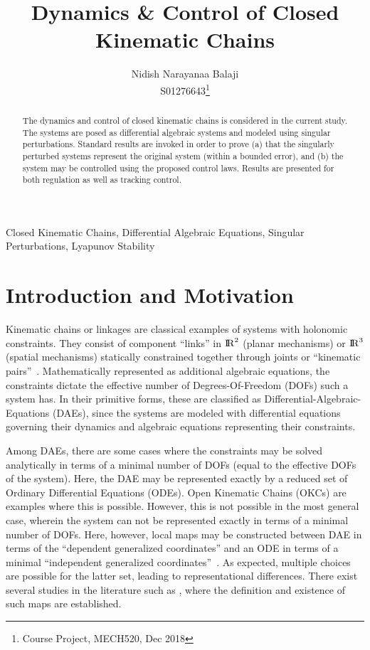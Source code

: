 \documentclass[10pt,final,journal,letterpaper,oneside,twocolumn]{IEEEtran}
\title{Dynamics \& Control of Closed Kinematic Chains}
\author{Nidish Narayanaa Balaji\\S01276643\thanks{Course Project,
    MECH520, Dec 2018}}
\newcommand{\Real}{{\rm I\!R}}
\begin{document}
\maketitle{}

\begin{abstract}
  The dynamics and control of closed kinematic chains is considered in
  the current study. The systems are posed as differential algebraic
  systems and modeled using singular perturbations. Standard results
  are invoked in order to prove (a) that the singularly perturbed
  systems represent the original system (within a bounded error), and
  (b) the system may be controlled using the proposed control
  laws. Results are presented for both regulation as well as tracking
  control.
\end{abstract}
\begin{IEEEkeywords}
  Closed Kinematic Chains, Differential Algebraic Equations, Singular
  Perturbations, Lyapunov Stability
\end{IEEEkeywords}

\section{Introduction and Motivation}
\label{sec:intr-motiv}

Kinematic chains or linkages are classical examples of systems with
holonomic constraints. They consist of component ``links'' in
$\Real^2$ (planar mechanisms) or $\Real^3$ (spatial
mechanisms) statically constrained together through joints or
``kinematic pairs''~\cite{ghosh1988theory}. Mathematically represented
as additional algebraic equations, the constraints dictate the
effective number of Degrees-Of-Freedom (DOFs) such a system has. In
their primitive forms, these are classified as
Differential-Algebraic-Equations (DAEs), since the systems are modeled
with differential equations governing their dynamics and algebraic
equations representing their constraints. 

Among DAEs, there are some cases where the constraints may be solved
analytically in terms of a minimal number of DOFs (equal to the
effective DOFs of the system). Here, the DAE may be represented
exactly by a reduced set of Ordinary Differential Equations
(ODEs). Open Kinematic Chains (OKCs) are examples where this is
possible. However, this is not possible in the most general case,
wherein the system can not be represented exactly in terms of a
minimal number of DOFs. Here, however, local maps may be constructed
between DAE in terms of the ``dependent generalized coordinates'' and
an ODE in terms of a minimal ``independent generalized
coordinates''~\cite{ghorbel_modeling_2000}. As expected, multiple
choices are possible for the latter set, leading to representational
differences. There exist several studies in the literature such as
\cite{ghorbel_modeling_2000, gunawardana_reduced_nodate}, where the
definition and existence of such maps are established.
\end{document}

